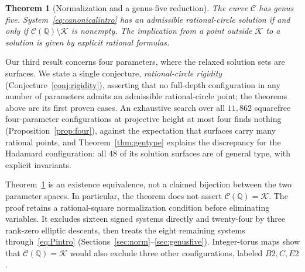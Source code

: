 \documentclass[11pt,letterpaper]{article}
\newtheorem{theorem}{Theorem}[section]
\theoremstyle{definition}\newtheorem{definition}[theorem]{Definition}
\theoremstyle{remark}\newtheorem{remark}[theorem]{Remark}
\newcommand{\Q}{\mathbb Q}\newcommand{\Z}{\mathbb Z}\newcommand{\R}{\mathbb R}
\begin{document}
\begin{theorem}[Normalization and a genus-five reduction]\label{thm:main-d1}
The curve $\mathcal C$ has genus five. System~\eqref{eq:canonicalintro} has an admissible rational-circle solution if and only if $\mathcal C(\Q)\setminus\mathcal K$ is nonempty. The implication from a point outside $\mathcal K$ to a solution is given by explicit rational formulas.
\end{theorem}
Our third result concerns four parameters, where the relaxed solution sets are surfaces. We state a single conjecture, \emph{rational-circle rigidity} (Conjecture~\ref{conj:rigidity}), asserting that no full-depth configuration in any number of parameters admits an admissible rational-circle point; the theorems above are its first proven cases. An exhaustive search over all $11{,}862$ squarefree four-parameter configurations at projective height at most four finds nothing (Proposition~\ref{prop:four}), against the expectation that surfaces carry many rational points, and Theorem~\ref{thm:gentype} explains the discrepancy for the Hadamard configuration: all $48$ of its solution surfaces are of general type, with explicit invariants.

Theorem~\ref{thm:main-d1} is an existence equivalence, not a claimed bijection between the two parameter spaces. In particular, the theorem does not assert $\mathcal C(\Q)=\mathcal K$. The proof retains a rational-square normalization condition before eliminating variables. It excludes sixteen signed systems directly and twenty-four by three rank-zero elliptic descents, then treats the eight remaining systems through~\eqref{eq:Pintro} (Sections~\ref{sec:norm}--\ref{sec:genusfive}). Integer-torus maps show that $\mathcal C(\Q)=\mathcal K$ would also exclude three other configurations, labeled $B2,C,E2$.
\end{document}
